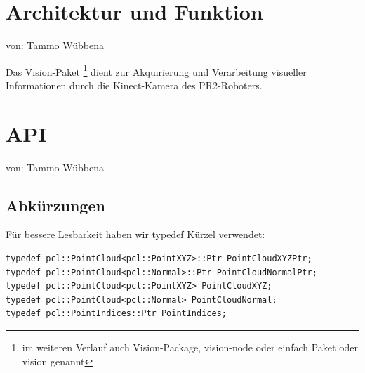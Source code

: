 \documentclass{suturo}
\begin{document}

\makeatletter
\newcommand{\chapterauthor}[1]{%
  {\parindent0pt\vspace*{-47pt}%
  \linespread{2.2}\large\begin{flushright}von: #1\end{flushright}%
  \par\nobreak\vspace*{0pt}}
  \@afterheading%
}
\makeatother

\section*{Architektur und Funktion}
\chapterauthor{Tammo Wübbena}
Das Vision-Paket \footnote{im weiteren Verlauf auch Vision-Package, vision-node oder einfach Paket oder vision genannt} dient zur Akquirierung und Verarbeitung visueller Informationen durch die Kinect-Kamera des PR2-Roboters.

\begin{figure}[!htb]
\end{figure}
      
\section*{API}
\chapterauthor{Tammo Wübbena}

\subsection{Abkürzungen}
Für bessere Lesbarkeit haben wir typedef Kürzel verwendet:
\begin{verbatim}
typedef pcl::PointCloud<pcl::PointXYZ>::Ptr PointCloudXYZPtr;
typedef pcl::PointCloud<pcl::Normal>::Ptr PointCloudNormalPtr;
typedef pcl::PointCloud<pcl::PointXYZ> PointCloudXYZ;
typedef pcl::PointCloud<pcl::Normal> PointCloudNormal;
typedef pcl::PointIndices::Ptr PointIndices;
\end{verbatim}
\end{document}
